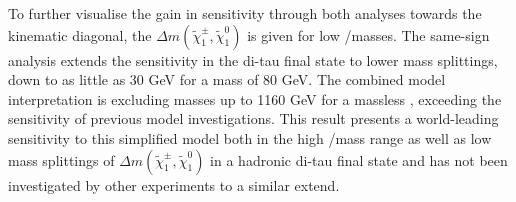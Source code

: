 To further visualise the gain in sensitivity through both analyses towards the kinematic diagonal,  the $\Delta m (\tilde{\chi}_1^\pm,\tilde{\chi}_1^0)$ is given for low \Cone/\Ntwo masses.  The same-sign analysis extends the sensitivity in the di-tau final state to lower mass splittings,  down to as little as 30 GeV for a \Cone mass of 80 GeV.  The combined model interpretation is excluding \Cone masses up to 1160 GeV for a massless \None, exceeding the sensitivity of previous model investigations. This result presents a world-leading sensitivity to this simplified model both in the high \Cone/\Ntwo mass range as well as low mass splittings of $\Delta m (\tilde{\chi}_1^\pm,\tilde{\chi}_1^0)$ in a hadronic di-tau final state and has not been investigated by other experiments to a similar extend. 

